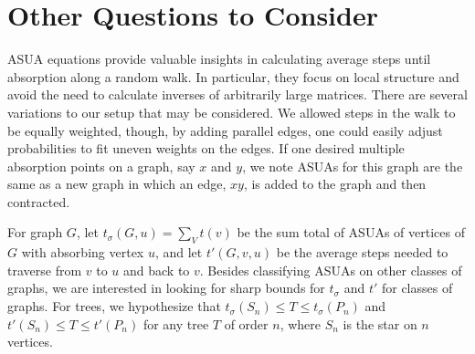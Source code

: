 \documentclass{article}
\theoremstyle{definition}
\begin{document}
\section{Other Questions to Consider}

\noindent ASUA equations provide valuable insights in calculating average steps until absorption along a random walk. In particular, they focus on local structure and avoid the need to calculate inverses of arbitrarily large matrices. There are several variations to our setup that may be considered. We allowed steps in the walk to be equally weighted, though, by adding parallel edges, one could easily adjust probabilities to fit uneven weights on the edges. If one desired multiple absorption points on a graph, say $x$ and $y$, we note ASUAs for this graph are the same as a new graph in which an edge, $xy$, is added to the graph and then contracted.  


\noindent For graph $G$, let $t_{\sigma}(G, u) = \sum_{V} t(v)$ be the sum total of ASUAs of vertices of $G$ with absorbing vertex $u$, and let $t'(G, v, u)$ be the average steps needed to traverse from $v$ to $u$ and back to $v$. Besides classifying ASUAs on other classes of graphs, we are interested in looking for sharp bounds for $t_{\sigma}$ and $t'$ for classes of graphs. For trees, we hypothesize that $t_{\sigma}(S_n) \leq T \leq t_{\sigma}(P_n)$ and $t'(S_n) \leq T \leq t'(P_n)$ for any tree $T$ of order $n$, where $S_n$ is the star on $n$ vertices.






    \nocite{*}
    \footnotesize{}
    
\end{document}
